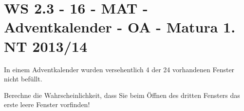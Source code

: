 \section{WS 2.3 - 16 - MAT - Adventkalender - OA - Matura 1. NT 2013/14}

\begin{beispiel}[WS 2.3]{1} %
				In einem Adventkalender wurden versehentlich 4 der 24 vorhandenen Fenster nicht befüllt.

Berechne die Wahrscheinlichkeit, dass Sie beim Öffnen des dritten Fensters das erste leere Fenster vorfinden!\leer

\end{beispiel}